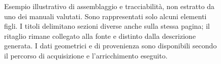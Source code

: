 \begin{figure}[htbp]
\caption{Esempio illustrativo di assemblaggio e tracciabilità, non estratto da uno dei manuali valutati. Sono rappresentati solo alcuni elementi figli. I titoli delimitano sezioni diverse anche sulla stessa pagina; il ritaglio rimane collegato alla fonte e distinto dalla descrizione generata. I dati geometrici e di provenienza sono disponibili secondo il percorso di acquisizione e l'arricchimento eseguito.}
\label{fig:gerarchia-provenienza}
\end{figure}